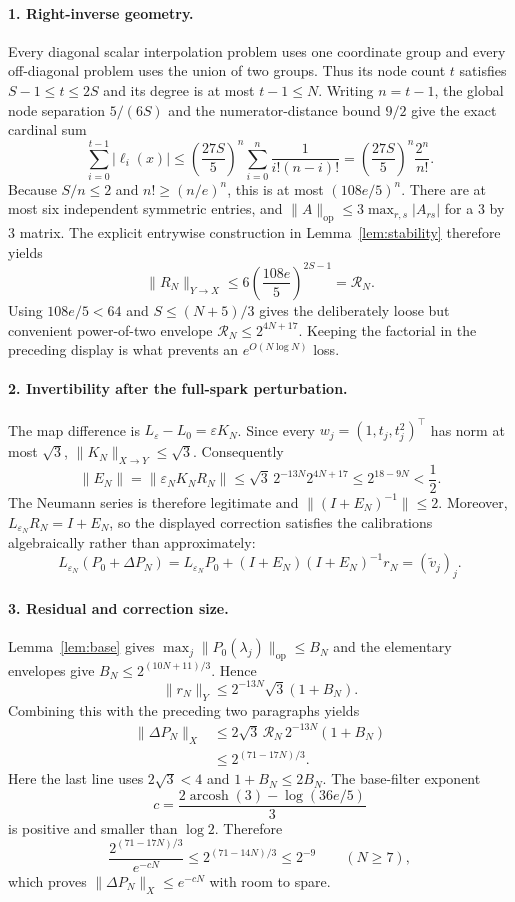 \documentclass[11pt]{article}
\theoremstyle{remark}
\newcommand{\op}{\mathrm{op}}
\begin{document}
\paragraph{1. Right-inverse geometry.}
Every diagonal scalar interpolation problem uses one coordinate group and
every off-diagonal problem uses the union of two groups.  Thus its node count
$t$ satisfies $S-1\le t\le2S$ and its degree is at most $t-1\le N$.
Writing $n=t-1$, the global node separation $5/(6S)$ and the numerator-distance
bound $9/2$ give the exact cardinal sum
\[
 \sum_{i=0}^{t-1}|\ell_i(x)|
 \le\left(\frac{27S}{5}\right)^n
       \sum_{i=0}^{n}\frac1{i!(n-i)!}
 =\left(\frac{27S}{5}\right)^n\frac{2^n}{n!}.
\]
Because $S/n\le2$ and $n!\ge(n/e)^n$, this is at most
$(108e/5)^n$.  There are at most six independent symmetric entries, and
$\|A\|_{\op}\le3\max_{r,s}|A_{rs}|$ for a $3$ by $3$ matrix.  The explicit
entrywise construction in Lemma~\ref{lem:stability} therefore yields
\[
 \|R_N\|_{Y\to X}
 \le6\left(\frac{108e}{5}\right)^{2S-1}=\mathcal R_N.
\]
Using $108e/5<64$ and $S\le(N+5)/3$ gives the deliberately loose but convenient
power-of-two envelope $\mathcal R_N\le2^{4N+17}$.  Keeping the factorial in the
preceding display is what prevents an $e^{O(N\log N)}$ loss.

\paragraph{2. Invertibility after the full-spark perturbation.}
The map difference is $L_\varepsilon-L_0=\varepsilon K_N$.  Since every
$w_j=(1,t_j,t_j^2)^\top$ has norm at most $\sqrt3$,
$\|K_N\|_{X\to Y}\le\sqrt3$.  Consequently
\[
 \|E_N\|=\|\varepsilon_NK_NR_N\|
 \le\sqrt3\,2^{-13N}2^{4N+17}
 \le2^{18-9N}<\frac12.
\]
The Neumann series is therefore legitimate and
$\|(I+E_N)^{-1}\|\le2$.  Moreover,
$L_{\varepsilon_N}R_N=I+E_N$, so the displayed correction satisfies the
calibrations algebraically rather than approximately:
\[
 L_{\varepsilon_N}(P_0+\Delta P_N)
 =L_{\varepsilon_N}P_0+(I+E_N)(I+E_N)^{-1}r_N
 =(\widetilde v_j)_j.
\]

\paragraph{3. Residual and correction size.}
Lemma~\ref{lem:base} gives
$\max_j\|P_0(\lambda_j)\|_{\op}\le B_N$ and the elementary envelopes give
$B_N\le2^{(10N+11)/3}$.  Hence
\[
 \|r_N\|_Y
 \le2^{-13N}\sqrt3(1+B_N).
\]
Combining this with the preceding two paragraphs yields
\begin{align*}
 \|\Delta P_N\|_X
 &\le2\sqrt3\,\mathcal R_N\,2^{-13N}(1+B_N)\\
 &\le2^{(71-17N)/3}.
\end{align*}
Here the last line uses $2\sqrt3<4$ and $1+B_N\le2B_N$.
The base-filter exponent
\[
 c=\frac{2\operatorname{arcosh}(3)-\log(36e/5)}{3}
\]
is positive and smaller than $\log2$.  Therefore
\[
 \frac{2^{(71-17N)/3}}{e^{-cN}}
\le2^{(71-14N)/3}\le2^{-9}\qquad(N\ge7),
\]
which proves $\|\Delta P_N\|_X\le e^{-cN}$ with room to spare.
\end{document}
